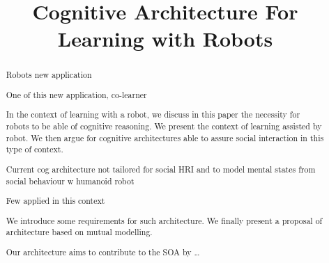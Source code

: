 \documentclass[conference]{IEEEtran}
\begin{document}
\title{Cognitive Architecture For Learning with Robots}


\author{
\and
{}
\and
{}
}



\maketitle

\begin{abstract}
Robots new application

One of this new application, co-learner


In the context of learning with a robot, we discuss in this paper  the necessity for robots to be able of cognitive reasoning. 
We present the context of learning assisted by robot. 
We then argue for cognitive architectures able to assure social interaction in this type of context. 

Current cog architecture not tailored for social HRI and to model mental states from social behaviour w humanoid robot

Few applied in this context

We introduce some requirements for such architecture. 
We finally present a proposal of architecture based on mutual modelling. 

Our architecture aims to contribute to the SOA by \dots

\end{abstract}





%
\IEEEpeerreviewmaketitle
\end{document}
